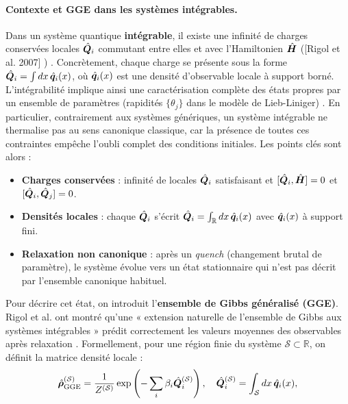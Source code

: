 \paragraph{Contexte et GGE dans les systèmes intégrables.}

Dans un système quantique {\bf intégrable}, il existe une infinité de charges conservées locales $\hat{\bm{Q}}_i$ commutant entre elles et avec l’Hamiltonien $\hat{\bm{H}}$ ([Rigol et al. 2007] ) \cite{??}. Concrètement, chaque charge se présente sous la forme $\hat{\bm{Q}}_i = \int dx \,\hat{\bm{q}}_i(x)$, où $\hat{\bm{q}}_i(x)$ est une densité d’observable locale à support borné. L’intégrabilité implique ainsi une caractérisation complète des états propres par un ensemble de paramètres (rapidités $\{\theta_j\}$ dans le modèle de Lieb-Liniger) \cite{??}. En particulier, contrairement aux systèmes génériques, un système intégrable ne thermalise pas au sens canonique classique, car la présence de toutes ces contraintes empêche l’oubli complet des conditions initiales. Les points clés sont alors :

\begin{itemize}[label = $\bullet$]
	\item {\bf Charges conservées} : infinité de locales $\hat{\bm{Q}}_i$ satisfaisant et $[\hat{\bm{Q}}_i , \hat{\bm{H}} ] = 0$ et $[\hat{\bm{Q}}_i , \hat{\bm{Q}}_j ] = 0$.
	\item {\bf Densités locales} : chaque $\hat{\bm{Q}}_i$ s’écrit $\hat{\bm{Q}}_i = \int_\mathbb{R} dx \, \hat{\bm{q}}_i(x)$ avec $\hat{\bm{q}}_i(x)$ à support fini.
	\item {\bf Relaxation non canonique} : après un {\em quench} (changement brutal de paramètre), le système évolue vers un état stationnaire qui n’est pas décrit par l’ensemble canonique habituel.
\end{itemize}

Pour décrire cet état, on introduit l’{\bf ensemble de Gibbs généralisé (GGE)}. Rigol et al. ont montré qu’une « extension naturelle de l’ensemble de Gibbs aux systèmes intégrables » prédit correctement les valeurs moyennes des observables après relaxation \cite{??}.  Formellement, pour une région finie du système $\mathcal{S} \subset \mathbb{R}$, on définit la matrice densité locale :
\begin{eqnarray}
	\hat{\bm{\rho}}^{(\mathcal{S})}_{\mathrm{GGE}} = \frac{1}{Z^{(\mathcal{S})}}\exp \left ( - \sum_i \beta_i \hat{\bm{Q}}_i^{(\mathcal{S})} \right), \quad \hat{\bm{Q}}_i^{(\mathcal{S})} = \int_\mathcal{S} dx \, \hat{\bm{q}}_i(x), \label{chap.TBA.op.rho.S}	
\end{eqnarray}

